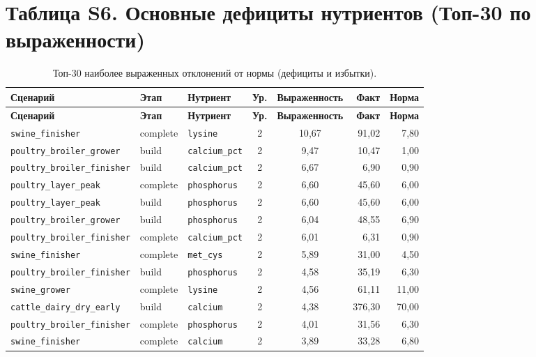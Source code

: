 \documentclass[11pt]{article}
\begin{document}
\section*{Таблица S6. Основные дефициты нутриентов (Топ-30 по выраженности)}
\begin{longtable}{lllccrr}
\caption{Топ-30 наиболее выраженных отклонений от нормы (дефициты и избытки).}\label{tab:s6_issues} \\
\toprule
\textbf{Сценарий} & \textbf{Этап} & \textbf{Нутриент} & \textbf{Ур.} & \textbf{Выраженность} & \textbf{Факт} & \textbf{Норма} \\
\midrule
\endfirsthead
\toprule
\textbf{Сценарий} & \textbf{Этап} & \textbf{Нутриент} & \textbf{Ур.} & \textbf{Выраженность} & \textbf{Факт} & \textbf{Норма} \\
\midrule
\endhead
\bottomrule
\endfoot
\bottomrule
\endlastfoot
\texttt{swine\_finisher} & complete & \texttt{lysine} & 2 & 10{,}67 & 91{,}02 & 7{,}80 \\
\texttt{poultry\_broiler\_grower} & build & \texttt{calcium\_pct} & 2 & 9{,}47 & 10{,}47 & 1{,}00 \\
\texttt{poultry\_broiler\_finisher} & build & \texttt{calcium\_pct} & 2 & 6{,}67 & 6{,}90 & 0{,}90 \\
\texttt{poultry\_layer\_peak} & complete & \texttt{phosphorus} & 2 & 6{,}60 & 45{,}60 & 6{,}00 \\
\texttt{poultry\_layer\_peak} & build & \texttt{phosphorus} & 2 & 6{,}60 & 45{,}60 & 6{,}00 \\
\texttt{poultry\_broiler\_grower} & build & \texttt{phosphorus} & 2 & 6{,}04 & 48{,}55 & 6{,}90 \\
\texttt{poultry\_broiler\_finisher} & complete & \texttt{calcium\_pct} & 2 & 6{,}01 & 6{,}31 & 0{,}90 \\
\texttt{swine\_finisher} & complete & \texttt{met\_cys} & 2 & 5{,}89 & 31{,}00 & 4{,}50 \\
\texttt{poultry\_broiler\_finisher} & build & \texttt{phosphorus} & 2 & 4{,}58 & 35{,}19 & 6{,}30 \\
\texttt{swine\_grower} & complete & \texttt{lysine} & 2 & 4{,}56 & 61{,}11 & 11{,}00 \\
\texttt{cattle\_dairy\_dry\_early} & build & \texttt{calcium} & 2 & 4{,}38 & 376{,}30 & 70{,}00 \\
\texttt{poultry\_broiler\_finisher} & complete & \texttt{phosphorus} & 2 & 4{,}01 & 31{,}56 & 6{,}30 \\
\texttt{swine\_finisher} & complete & \texttt{calcium} & 2 & 3{,}89 & 33{,}28 & 6{,}80 \\

\end{longtable}
\end{document}
